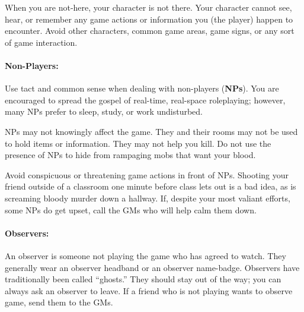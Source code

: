 \documentclass[sheet]{airship}
\begin{document}
When you are not-here, your character is not there.  Your character
cannot see, hear, or remember any game actions or information you (the
player) happen to encounter.  Avoid other characters, common game
areas, game signs, or any sort of game interaction.

\paragraph{Non-Players:} Use tact and common sense when dealing with
non-players ({\bf NPs}).  You are encouraged to spread the gospel of
real-time, real-space roleplaying; however, many NPs prefer to sleep,
study, or work undisturbed.

NPs may not knowingly affect the game.  They and their rooms may not
be used to hold items or information.  They may not help you kill.  Do
not use the presence of NPs to hide from rampaging mobs that want your
blood.

Avoid conspicuous or threatening game actions in front of NPs.
Shooting your friend outside of a classroom one minute before class
lets out is a bad idea, as is screaming bloody murder down a hallway.
If, despite your most valiant efforts, some NPs do get upset, call the
GMs who will help calm them down.


\paragraph{Observers:} An observer is someone not playing the game who
has agreed to watch.  They generally wear an observer headband or an
observer name-badge.  Observers have traditionally been called
``ghosts.''  They should stay out of the way; you can always ask an
observer to leave.  If a friend who is not playing wants to observe
game, send them to the GMs.
\end{document}
